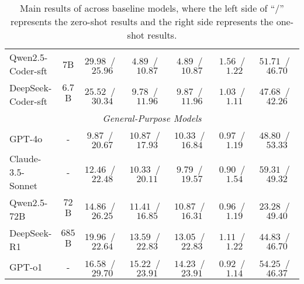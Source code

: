 \begin{table*}[ht!]
{\begin{tabular}{lcccccc}
        Qwen2.5-Coder-sft	& $7$B            &$\mathbf{29.98}$~/~$25.96$     &$4.89$~/~$10.87$                         &$4.89$~/~$10.87$                   &$\mathbf{1.56}$~/~$\mathbf{1.22}$    &$\mathbf{51.71}$~/~$\mathbf{46.70}$     \\
        DeepSeek-Coder-sft & $6.7$B          &$25.52$~/~$\mathbf{30.34}$&$\mathbf{9.78}$~/~$\mathbf{11.96}$       &$\mathbf{9.87}$~/~$\mathbf{11.96}$ &$1.03$~/~$1.11$    &$47.68$~/~$42.26$     \\
        \midrule
                \multicolumn{7}{c}{\textit{General-Purpose Models}} \\
        GPT-4o                  & -             &$9.87$~/~$20.67$                 &$10.87$~/~$17.93$                        &$10.33$~/~$16.84$                    & $0.97$~/~$1.19$           &$48.80$~/~$\mathbf{53.33}$     \\
        Claude-3.5-Sonnet       & -             &$12.46$~/~$22.48$                &$10.33$~/~$20.11$                        & $9.79$~/~$19.57$                    & $0.90$~/~$\mathbf{1.54}$           &$\mathbf{59.31}$~/~$49.32$     \\
        Qwen2.5-72B             & $72$B           &$14.86$~/~$26.25$                &$11.41$~/~$16.85$                        &$10.87$~/~$16.31$                    & $0.96$~/~$1.19$   & $23.28$~/~$49.40$     \\
        DeepSeek-R1             &$685$B           &$\mathbf{19.96}$~/~$22.64$       &$13.59$~/~$22.83$                        &$13.05$~/~$22.83$                    & $\mathbf{1.11}$~/~$1.22$   & $44.83$~/~$46.70$     \\
        GPT-o1                  & -             &$16.58$~/~$\mathbf{29.70}$       &$\mathbf{15.22}$~/~$\mathbf{23.91}$      &$\mathbf{14.23}$~/~$\mathbf{23.91}$  &$0.92$~/~$1.14$   &$54.25$~/~$46.37$     \\
        \bottomrule
    \end{tabular}
    }
    \caption{Main results of \benchone across baseline models, where the left side of ``/'' represents the zero-shot results and the right side represents the one-shot results.}
    \label{tab:git_res}
\end{table*}

